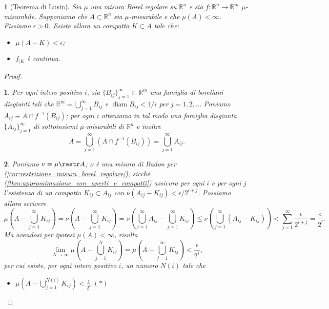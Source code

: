 \documentclass[a4paper,10pt,openright,oneside]{book}
\theoremstyle{theoremstyle}
\theoremstyle{theoremstylewoheader}
\newtheorem{teorema2}[teorema]{}
\theoremstyle{theoremstyle}
\theoremstyle{proofsecstyle}
\newtheorem{proofsec}{}
\theoremstyle{nonumberplain}
\newtheorem{proof}{Dim.}
\newcommand{\RR}{\ensuremath{\mathbb{R}}}
\DeclareMathOperator{\diam}{diam}
\newcommand{\mymath}[2]{\begin{itemize}%
  \item[]\hfill\hbox{}\ensuremath{\displaystyle #1}\hfill\ensuremath{\displaystyle #2}%
  \end{itemize}}
\begin{document}
\begin{teorema2}[Teorema di Lusin]
\label{thm:lusin}
Sia $\mu$ una misura Borel regolare su $\RR^n$ e sia $f : \RR^n \rightarrow \RR^m$ $\mu$-misurabile. Supponiamo che $A \subset \RR^n$ sia $\mu$-misurabile e che $\mu(A) < \infty$. Fissiamo $\epsilon > 0$. Esiste allora un compatto $K \subset A$ tale che:
\begin{itemize}
\item[(i)] $\mu(A - K) < \epsilon$;
\item[(ii)] $f_{|K}$ è continua.
\end{itemize}
\end{teorema2}

\begin{proof}
\begin{proofsec}
Per ogni intero positivo $i$, sia $\{B_{ij}\}_{j=1}^\infty \subset \RR^m$ una famiglia di boreliani \emph{disgiunti}\/ tali che $\RR^m = \bigcup_{j=1}^\infty B_{ij}$ e $\diam B_{ij} < 1/i$ per $j = 1, 2, \ldots$ Poniamo $A_{ij} \equiv A \cap f^{-1}(B_{ij})$; per ogni $i$ otteniamo in tal modo una famiglia disgiunta $\{A_{ij}\}_{j=1}^\infty$ di sottoinsiemi $\mu$-misurabili di $\RR^n$ e inoltre
\[
A = \bigcup_{j=1}^\infty (A \cap f^{-1}(B_{ij})) = \bigcup_{j=1}^\infty A_{ij}.
\]
\end{proofsec}

\begin{proofsec}
Poniamo $\nu \equiv \mu \restr A$; $\nu$ è una misura di Radon per (\ref{cor:restrizione_misura_borel_regolare}), sicché (\ref{thm:approssimazione_con_aperti_e_compatti}) assicura per ogni $i$ e per ogni $j$ l'esistenza di un compatto $K_{ij} \subset A_{ij}$ con $\nu(A_{ij} - K_{ij}) < \epsilon/2^{i+j}$. Possiamo allora scrivere
\[
\mu\left(A - \bigcup_{j=1}^\infty K_{ij}\right) = \nu\left(A - \bigcup_{j=1}^\infty K_{ij}\right) = \nu\left(\bigcup_{j=1}^\infty A_{ij} - \bigcup_{j=1}^\infty K_{ij}\right) \le \nu\left(\bigcup_{j=1}^\infty (A_{ij} - K_{ij})\right) < \sum_{j=1}^\infty \frac{\epsilon}{2^{i+j}} = \frac{\epsilon}{2^i}.
\]
Ma avendosi per ipotesi $\mu(A) < \infty$, risulta
\[
\lim_{N \to \infty} \mu\left(A - \bigcup_{j=1}^N K_{ij}\right) = \mu\left(A - \bigcup_{j=1}^\infty K_{ij}\right) < \frac{\epsilon}{2^i},
\]
per cui esiste, per ogni intero positivo $i$, un numero $N(i)$ tale che \mymath{\mu\left(A - \bigcup_{j=1}^{N(i)} K_{ij}\right) < \frac{\epsilon}{2^i}.}{(*)}
\end{proofsec}


\end{proof}
\end{document}

